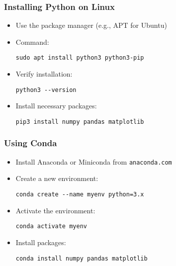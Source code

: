 \documentclass{beamer}
\begin{document}
\begin{frame}
    \frametitle{Installing Python on Linux}
    \begin{itemize}
        \item Use the package manager (e.g., APT for Ubuntu)
        \item Command:
        \begin{tcolorbox}[colback=lightblue, colframe=darkblue, title=Install Python]
            \lstinline|sudo apt install python3 python3-pip|
        \end{tcolorbox}
        \item Verify installation:
        \begin{tcolorbox}[colback=lightblue, colframe=darkblue, title=Verify Installation]
            \lstinline|python3 --version|
        \end{tcolorbox}
        \item Install necessary packages:
        \begin{tcolorbox}[colback=lightblue, colframe=darkblue, title=Install Packages]
            \lstinline|pip3 install numpy pandas matplotlib|
        \end{tcolorbox}
    \end{itemize}
\end{frame}

\begin{frame}
    \frametitle{Using Conda}
    \begin{itemize}
        \item Install Anaconda or Miniconda from \texttt{anaconda.com}
        \item Create a new environment:
        \begin{tcolorbox}[colback=lightblue, colframe=darkblue, title=Create Environment]
            \lstinline|conda create --name myenv python=3.x|
        \end{tcolorbox}
        \item Activate the environment:
        \begin{tcolorbox}[colback=lightblue, colframe=darkblue, title=Activate Environment]
            \lstinline|conda activate myenv|
        \end{tcolorbox}
        \item Install packages:
        \begin{tcolorbox}[colback=lightblue, colframe=darkblue, title=Install Packages]
            \lstinline|conda install numpy pandas matplotlib|
        \end{tcolorbox}
    \end{itemize}
\end{frame}
\end{document}
